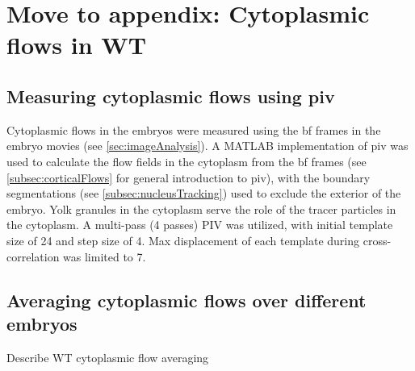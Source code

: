 \section{Move to appendix: Cytoplasmic flows in WT} 

\subsection{Measuring cytoplasmic flows using \ac{piv}} %
Cytoplasmic flows in the embryos were measured using the \ac{bf} frames in the embryo movies (see \autoref{sec:imageAnalysis}). A MATLAB implementation of \ac{piv} \citep{thielicke2014pivlab} was used to calculate the flow fields in the cytoplasm from the \ac{bf} frames (see \autoref{subsec:corticalFlows} for general introduction to \ac{piv}), with the boundary segmentations (see \autoref{subsec:nucleusTracking}) used to exclude the exterior of the embryo. Yolk granules in the cytoplasm serve the role of the tracer particles in the cytoplasm. A multi-pass (4 passes) PIV was utilized, with initial template size of \SI{24}{\pixels} and step size of \SI{4}{\pixels}. Max displacement of each template during cross-correlation was limited to \SI{7}{\pixels}. 

\subsection{Averaging cytoplasmic flows over different embryos}

Describe WT cytoplasmic flow averaging
